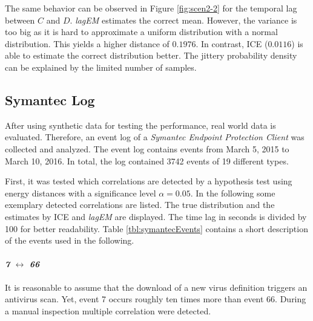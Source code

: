\documentclass[conference]{IEEEtran}
\theoremstyle{examplestyle}
\begin{document}
The same behavior can be observed in Figure \ref{fig:scen2-2} for the temporal lag between \(C\) and \(D\). \textit{lagEM} estimates the correct mean. However, the variance is too big as it is hard to approximate a uniform distribution with a normal distribution. This yields a higher distance of $0.1976$. In contrast, \ac{ICE} ($0.0116$) is able to estimate the correct distribution better. The jittery probability density can be explained by the limited number of samples.









\subsection{Symantec Log}
\label{sec:symantecLog}

After using synthetic data for testing the performance, real world data is evaluated. Therefore, an event log of a \textit{Symantec Endpoint Protection Client} was collected and analyzed. The event log contains events from March 5, 2015 to March 10, 2016. In total, the log contained 3742 events of 19 different types.



First, it was tested which correlations are detected by a hypothesis test using energy distances with a significance level \(\alpha = 0.05\). In the following some exemplary detected correlations are listed. The true distribution and the estimates by \ac{ICE} and \textit{lagEM} are displayed. The time lag in seconds is divided by 100 for better readability. Table \ref{tbl:symantecEvents} contains a short description of the events used in the following.


\paragraph{\textit{7} \(\leftrightarrow\) \textit{66}} It is reasonable to assume that the download of a new virus definition triggers an antivirus scan. Yet, event 7 occurs roughly ten times more than event 66. During a manual inspection multiple correlation were detected.
\end{document}
